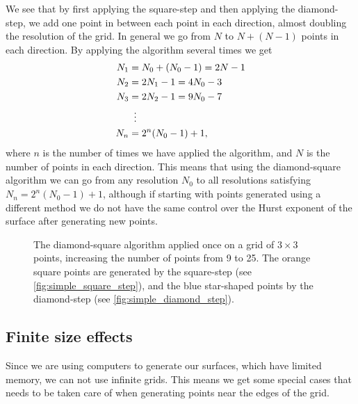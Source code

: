 We see that by first applying the square-step and then applying the diamond-step, we add one point in between each point in each direction, almost doubling the resolution of the grid. In general we go from $N$ to $N + (N-1)$ points in each direction. By applying the algorithm several times we get
\begin{align}
    N_1 &= N_0 + (N_0-1) = 2N - 1 \nonumber\\
    N_2 &= 2N_1 - 1 = 4N_0 - 3 \nonumber\\
    N_3 &= 2N_2 - 1 = 9N_0 - 7 \nonumber\\
    &\vdotswithin{=} \nonumber\\
    N_n &= 2^n(N_0-1) + 1, \label{eq:diamond_step_resolution}
\end{align}
where $n$ is the number of times we have applied the algorithm, and $N$ is the number of points in each direction. This means that using the diamond-square algorithm we can go from any resolution $N_0$ to all resolutions satisfying $N_n = 2^n(N_0 - 1) + 1$, although if starting with points generated using a different method we do not have the same control over the Hurst exponent of the surface after generating new points.
%
\begin{figure}[htpb]%
    \centering%
    \caption{%
        The diamond-square algorithm applied once on a grid of $3\times 3$ points, increasing the number of points from 9 to 25. The orange square points are generated by the square-step (see \cref{fig:simple_square_step}), and the blue star-shaped points by the diamond-step (see \cref{fig:simple_diamond_step}).%
    }%
    \label{fig:diamond_square_applied}%
\end{figure}%

\subsection{Finite size effects\label{sec:diamond_square_2d_finite}}
Since we are using computers to generate our surfaces, which have limited memory, we can not use infinite grids. This means we get some special cases that needs to be taken care of when generating points near the edges of the grid.

